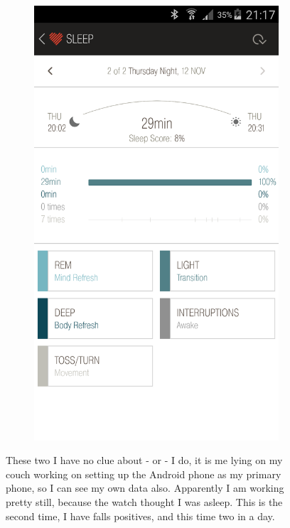 \documentclass[12pt,a4paper]{article}
\begin{document}
\begin{figure}[H]
\begin{subfigure}[b]{0.5\textwidth}
        \includegraphics[width=\textwidth]{12-11-15-2.png}
    \end{subfigure}
\caption{These two I have no clue about - or - I do, it is me lying on my couch working on setting up the Android phone as my primary phone, so I can see my own data also. Apparently I am working pretty still, because the watch thought I was asleep. This is the second time, I have falls positives, and this time two in a day. }
\end{figure}



\end{document}
